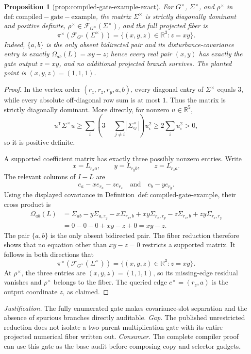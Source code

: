 \documentclass{article}
\newtheorem{proposition}{Proposition}
\begin{document}
\begin{proposition}[prop:compiled-gate-example-exact]\label{prop:compiled-gate-example-exact}
For \(G^{\times}\), \(\Sigma^{\times}\), and \(\rho^{\times}\) in \(\mathrm{def:compiled-gate-example}\), the matrix \(\Sigma^{\times}\) is strictly diagonally dominant and positive definite, \(\rho^{\times}\in\mathcal F_{G^{\times}}(\Sigma^{\times})\), and the full projected fiber is \[\pi^{\times}(\mathcal F_{G^{\times}}(\Sigma^{\times}))=\{(x,y,z)\in\mathbb R^3:z=xy\}.\] Indeed, \(\{a,b\}\) is the only absent bidirected pair and its disturbance-covariance entry is exactly \(\Omega_{ab}(L)=xy-z\); hence every real pair \((x,y)\) has exactly the gate output \(z=xy\), and no additional projected branch survives. The planted point is \((x,y,z)=(1,1,1)\).
\end{proposition}
\begin{proof}
In the vertex order \((r_x,r_z,r_y,a,b)\), every diagonal entry of \(\Sigma^{\times}\) equals \(3\), while every absolute off-diagonal row sum is at most \(1\).  Thus the matrix is strictly diagonally dominant.  More directly, for nonzero \(u\in\mathbb R^5\),
\[
u^{\mathsf T}\Sigma^{\times}u
\ge\sum_i\left(3-\sum_{j\ne i}|\Sigma^{\times}_{ij}|\right)u_i^2
\ge2\sum_i u_i^2>0,
\]
so it is positive definite.

A supported coefficient matrix has exactly three possibly nonzero entries.  Write
\[
x=L_{r_xa},\qquad y=L_{r_yb},\qquad z=L_{r_za}.
\]
The relevant columns of \(I-L\) are
\[
e_a-xe_{r_x}-ze_{r_z}
\quad\text{and}\quad
e_b-ye_{r_y}.
\]
Using the displayed covariance in Definition~\(\mathrm{def:compiled\mbox{-}gate\mbox{-}example}\), their cross product is
\[
\begin{aligned}
\Omega_{ab}(L)
&=\Sigma_{ab}-y\Sigma_{a,r_y}-x\Sigma_{r_x,b}
+xy\Sigma_{r_x,r_y}-z\Sigma_{r_z,b}+zy\Sigma_{r_z,r_y}\\
&=0-0-0+xy-z+0=xy-z.
\end{aligned}
\]
The pair \(\{a,b\}\) is the only absent bidirected pair.  The fiber reduction therefore shows that no equation other than \(xy-z=0\) restricts a supported matrix.  It follows in both directions that
\[
\pi^{\times}(\mathcal F_{G^{\times}}(\Sigma^{\times}))
=\{(x,y,z)\in\mathbb R^3:z=xy\}.
\]
At \(\rho^{\times}\), the three entries are \((x,y,z)=(1,1,1)\), so its missing-edge residual vanishes and \(\rho^{\times}\) belongs to the fiber.  The queried edge \(e^{\times}=(r_z,a)\) is the output coordinate \(z\), as claimed.
\end{proof}
\par\smallskip\noindent \textit{Justification.} The fully enumerated gate makes covariance-slot separation and the absence of spurious branches directly auditable. \textit{Gap.} The published unrestricted reduction does not isolate a two-parent multiplication gate with its entire projected numerical fiber written out. \textit{Consumer.} The complete compiler proof can use this gate as the base audit before composing copy and selector gadgets.
\end{document}
